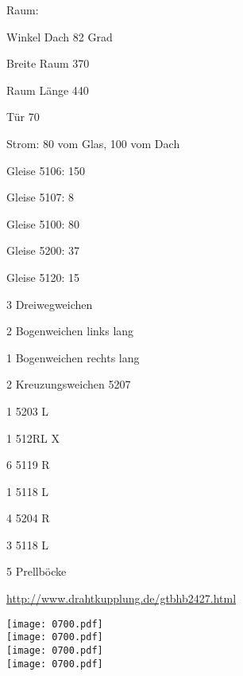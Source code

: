 \documentclass{article}
\begin{document}
Raum: 

Winkel Dach 82 Grad

Breite Raum 370

Raum Länge 440

Tür 70

Strom: 80 vom Glas, 100 vom Dach

Gleise 5106: 150

Gleise 5107: 8 

Gleise 5100: 80

Gleise 5200: 37

Gleise 5120: 15

3 Dreiwegweichen

2 Bogenweichen links lang

1 Bogenweichen rechts lang

2 Kreuzungsweichen 5207

1 5203 L

1 512RL X

6 5119 R

1 5118 L

4 5204 R

3 5118 L

5 Prellböcke

\url{http://www.drahtkupplung.de/gtbhb2427.html}

\newpage
\texttt{[image: 0700.pdf]} \\

\texttt{[image: 0700.pdf]} \\

\texttt{[image: 0700.pdf]} \\

\texttt{[image: 0700.pdf]} \\
\end{document}
